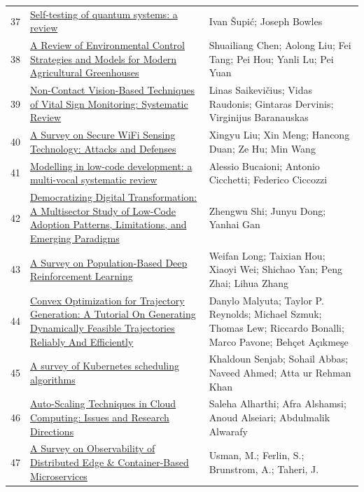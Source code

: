 \documentclass[11pt]{article}
\begin{document}
\begin{longtable}{cp{8cm}p{5cm}}
  37 & \href{https://arxiv.org/abs/1904.10042}{Self-testing of quantum systems: a review} & Ivan Šupić; Joseph Bowles \\
  38 & \href{https://www.mdpi.com/1424-8220/25/5/1388}{A Review of Environmental Control Strategies and Models for Modern Agricultural Greenhouses} & Shuailiang Chen; Aolong Liu; Fei Tang; Pei Hou; Yanli Lu; Pei Yuan \\
  39 & \href{https://www.mdpi.com/1424-8220/24/12/3963}{Non-Contact Vision-Based Techniques of Vital Sign Monitoring: Systematic Review} & Linas Saikevičius; Vidas Raudonis; Gintaras Dervinis; Virginijus Baranauskas \\
  40 & \href{https://www.mdpi.com/1424-8220/25/6/1913}{A Survey on Secure WiFi Sensing Technology: Attacks and Defenses} & Xingyu Liu; Xin Meng; Hancong Duan; Ze Hu; Min Wang \\
  41 & \href{https://link.springer.com/article/10.1007/s10270-021-00964-0}{Modelling in low-code development: a multi-vocal systematic review} & Alessio Bucaioni; Antonio Cicchetti; Federico Ciccozzi \\
  42 & \href{https://www.mdpi.com/2076-3417/15/12/6481}{Democratizing Digital Transformation: A Multisector Study of Low-Code Adoption Patterns, Limitations, and Emerging Paradigms} & Zhengwu Shi; Junyu Dong; Yanhai Gan \\
  43 & \href{https://www.mdpi.com/2227-7390/11/10/2234}{A Survey on Population-Based Deep Reinforcement Learning} & Weifan Long; Taixian Hou; Xiaoyi Wei; Shichao Yan; Peng Zhai; Lihua Zhang \\
  44 & \href{http://ieeexplore.ieee.org/document/9905530}{Convex Optimization for Trajectory Generation: A Tutorial On Generating Dynamically Feasible Trajectories Reliably And Efficiently} & Danylo Malyuta; Taylor P. Reynolds; Michael Szmuk; Thomas Lew; Riccardo Bonalli; Marco Pavone; Behçet Açıkmeşe \\
  45 & \href{https://journalofcloudcomputing.springeropen.com/articles/10.1186/s13677-023-00471-1}{A survey of Kubernetes scheduling algorithms} & Khaldoun Senjab; Sohail Abbas; Naveed Ahmed; Atta ur Rehman Khan \\
  46 & \href{https://www.mdpi.com/1424-8220/24/17/5551}{Auto-Scaling Techniques in Cloud Computing: Issues and Research Directions} & Saleha Alharthi; Afra Alshamsi; Anoud Alseiari; Abdulmalik Alwarafy \\
  47 & \href{https://ieeexplore.ieee.org/document/9837035/}{A Survey on Observability of Distributed Edge \& Container-Based Microservices} & Usman, M.; Ferlin, S.; Brunstrom, A.; Taheri, J. \\

\end{longtable}
\end{document}
